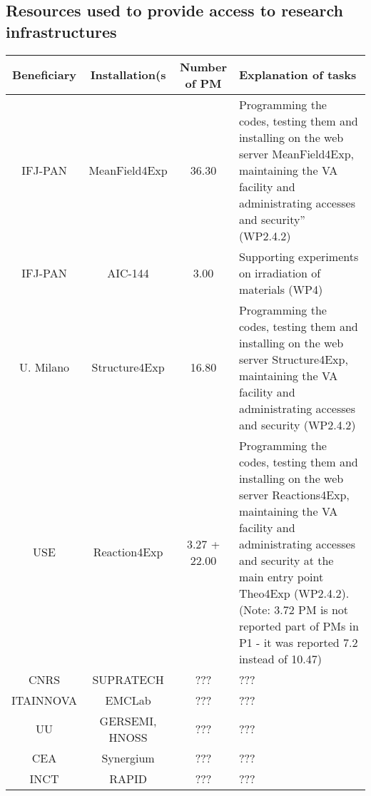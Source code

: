 %
\subsection{Resources used to provide access to research infrastructures}

\begin{table}[H]
\centering
\begin{tabularx}{\textwidth}{|c|c|c|X|} \hline
    \rowcolor{mycyan}
    {\bf Beneficiary} & {\bf Installation(s} & {\bf Number of PM}  & {\bf Explanation of tasks} \\ \hline
    IFJ-PAN & MeanField4Exp & 36.30 & Programming the codes, testing them and installing on the web server MeanField4Exp, maintaining the VA facility and administrating accesses and security” (WP2.4.2)\\ \hline
    IFJ-PAN & AIC-144 & 3.00 & Supporting experiments on irradiation of materials (WP4)\\ \hline
    U. Milano & Structure4Exp & 16.80 & Programming the codes, testing them and installing on the web server Structure4Exp, maintaining the VA facility and administrating accesses and security (WP2.4.2)\\ \hline 
   USE & Reaction4Exp & 3.27 + 22.00 & Programming the codes, testing them and installing on the web server Reactions4Exp, maintaining the VA facility and administrating accesses and security at the main entry point Theo4Exp (WP2.4.2). (Note: 3.72 PM is not reported part of PMs in P1 - it was reported 7.2 instead of 10.47) \\ \hline
   CNRS & SUPRATECH & ??? & ??? \\ \hline
   ITAINNOVA & EMCLab & ??? & ??? \\ \hline
   UU & GERSEMI, HNOSS & ??? & ??? \\ \hline
   CEA & Synergium & ??? & ??? \\ \hline
   INCT & RAPID & ??? & ??? \\ \hline
   
\end{tabularx}
\label{tab:resources}
\end{table}
